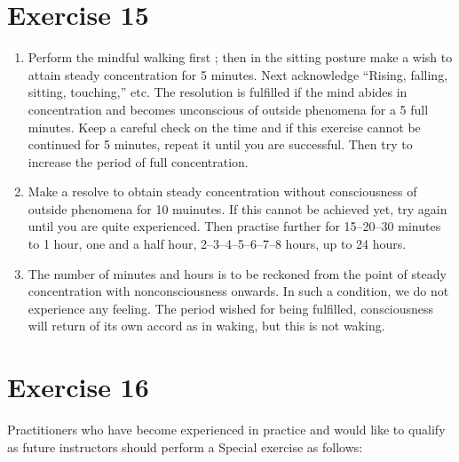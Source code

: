 \documentclass[a5paper,10pt,english]{book}
\begin{document}
\section{Exercise 15}
\label{\detokenize{practice:exercise-15}}\begin{enumerate}
%
\item {} 
\sphinxAtStartPar
Perform the mindful walking first ; then in the sitting posture make a wish to attain steady concentration for 5 minutes. Next acknowledge “Rising, falling, sitting, touching,” etc. The resolution is fulfilled if the mind abides in concentration and becomes unconscious of outside phenomena for a 5 full minutes. Keep a careful check on the time and if this exercise cannot be continued for 5 minutes, repeat it until you are successful. Then try to increase the period of full concentration.

\item {} 
\sphinxAtStartPar
Make a resolve to obtain steady concentration without consciousness of outside phenomena for 10 muinutes. If this cannot be achieved yet, try again until you are quite experienced. Then practise further for 15–20–30 minutes to 1 hour, one and a half hour, 2–3–4–5–6–7–8 hours, up to 24 hours.

\item {} 
\sphinxAtStartPar
The number of minutes and hours is to be reckoned from the point of steady concentration with nonconsciousness onwards. In such a condition, we do not experience any feeling. The period wished for being fulfilled, consciousness will return of its own accord as in waking, but this is not waking.

\end{enumerate}


\section{Exercise 16}
\label{\detokenize{practice:exercise-16}}
\sphinxAtStartPar
Practitioners who have become experienced in practice and would like to qualify as future instructors should perform a Special exercise as follows:
\end{document}
